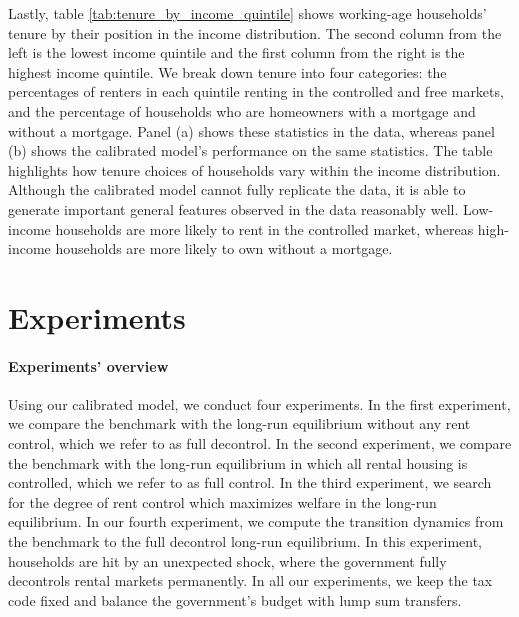 \documentclass[parskip=full]{article}
\begin{document}
Lastly, table \ref{tab:tenure_by_income_quintile} shows working-age households' tenure by their position in the income distribution. The second column from the left is the lowest income quintile and the first column from the right is the highest income quintile. We break down tenure into four categories: the percentages of renters in each quintile renting in the controlled and free markets, and the percentage of households who are homeowners with a mortgage and without a mortgage. Panel (a) shows these statistics in the data, whereas panel (b) shows the calibrated model's performance on the same statistics. The table highlights how tenure choices of households vary within the income distribution. Although the calibrated model cannot fully replicate the data, it is able to generate important general features observed in the data reasonably well. Low-income households are more likely to rent in the controlled market, whereas high-income households are more likely to own without a mortgage.

\section{Experiments}\label{section:experiments}

\paragraph{Experiments' overview} Using our calibrated model, we conduct four experiments. In the first experiment, we compare the benchmark with the long-run equilibrium without any rent control, which we refer to as full decontrol. In the second experiment, we compare the benchmark with the long-run equilibrium in which all rental housing is controlled, which we refer to as full control. In the third experiment, we search for the degree of rent control which maximizes welfare in the long-run equilibrium. In our fourth experiment, we compute the transition dynamics from the benchmark to the full decontrol long-run equilibrium. In this experiment, households are hit by an unexpected shock, where the government fully decontrols rental markets permanently. In all our experiments, we keep the tax code fixed and balance the government's budget with lump sum transfers. 
\end{document}
